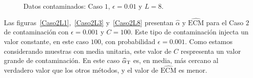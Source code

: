 \begin{figure}[H]
	\caption{\label{Caso1L8}\small Datos contaminados: Caso $1$, $\epsilon=0.01$ y $L=8$.}
\end{figure}


Las figuras~\ref{Caso2L1},~\ref{Caso2L3} y~\ref{Caso2L8} presentan $\widehat{\alpha}$ y $\widehat{\text{ECM}}$ para el Caso $2$ de contaminación con $\epsilon=0.001$ y $C=100$. Este tipo de contaminación injecta un valor constante, en este caso $100$, con probabilidad $\epsilon=0.001$. Como estamos considerando muestras con media unitaria, este valor de $C$ respresenta un valor grande de contaminación. En este caso $\widehat\alpha_{\text T}$ es, en media, más cercano al verdadero valor que los otros métodos, y el valor de $\widehat{\text{ECM}}$ es menor.

